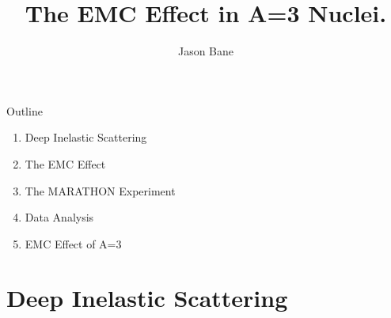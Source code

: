 \documentclass[12pt,usenames,dvipsnames]{beamer}
\title[EMC A=3]{The EMC Effect in A=3 Nuclei.} %
\author{Jason Bane} %
\institute[UTK] %
{
University of Tennessee \\ %
\medskip
\textit{jbane1@vols.utk.edu} %
}
\date{} %
\begin{document}
\begin{frame}
	\titlepage %
\end{frame}




\begin{frame}{Outline}
\large{
\begin{enumerate}
	\item Deep Inelastic Scattering
	\item The EMC Effect
	\item The MARATHON Experiment
	\item Data Analysis
	\item EMC Effect of A=3
\end{enumerate} 
}

\end{frame}




\section[DIS]{Deep Inelastic Scattering}
\end{document}
